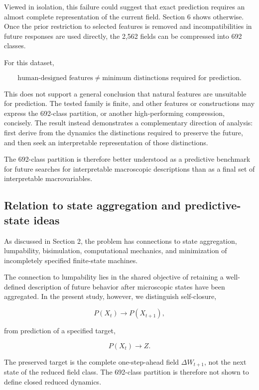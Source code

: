 \documentclass[
  11pt,
]{article}
\begin{document}
Viewed in isolation, this failure could suggest that exact prediction
requires an almost complete representation of the current field. Section
6 shows otherwise. Once the prior restriction to selected features is
removed and incompatibilities in future responses are used directly, the
2,562 fields can be compressed into 692 classes.

For this dataset,

\[{\text{human-designed features}\neq\text{minimum distinctions required for prediction}.}\]

This does not support a general conclusion that natural features are
unsuitable for prediction. The tested family is finite, and other
features or constructions may express the 692-class partition, or
another high-performing compression, concisely. The result instead
demonstrates a complementary direction of analysis: first derive from
the dynamics the distinctions required to preserve the future, and then
seek an interpretable representation of those distinctions.

The 692-class partition is therefore better understood as a predictive
benchmark for future searches for interpretable macroscopic descriptions
than as a final set of interpretable macrovariables.

\hypertarget{relation-to-state-aggregation-and-predictive-state-ideas}{%
\subsection{Relation to state aggregation and predictive-state
ideas}\label{relation-to-state-aggregation-and-predictive-state-ideas}}

As discussed in Section 2, the problem has connections to state
aggregation, lumpability, bisimulation, computational mechanics, and
minimization of incompletely specified finite-state machines.

The connection to lumpability lies in the shared objective of retaining
a well-defined description of future behavior after microscopic states
have been aggregated. In the present study, however, we distinguish
self-closure,

\[{P(X_t)\longrightarrow P(X_{t+1}),}\]

from prediction of a specified target,

\[{P(X_t)\longrightarrow Z.}\]

The preserved target is the complete one-step-ahead field
\({\Delta W_{t+1}}\), not the next state of the reduced field class. The
692-class partition is therefore not shown to define closed reduced
dynamics.
\end{document}

